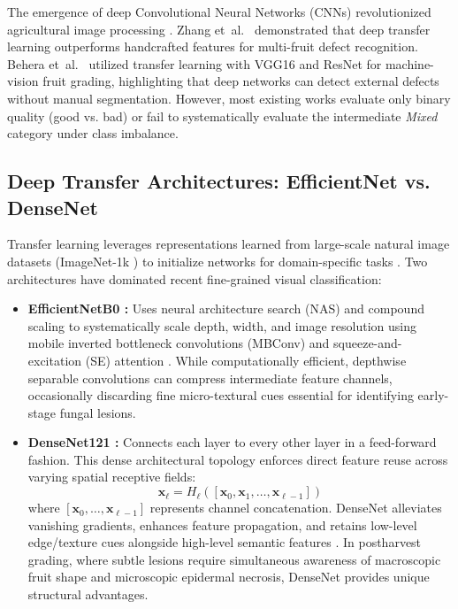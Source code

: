 \documentclass[conference]{IEEEtran}
\begin{document}
The emergence of deep Convolutional Neural Networks (CNNs) revolutionized agricultural image processing \cite{kamilaris2018deep, saleem2019plant}. Zhang et~al.~\cite{zhang2018fruit} demonstrated that deep transfer learning outperforms handcrafted features for multi-fruit defect recognition. Behera et~al.~\cite{behera2020fruit} utilized transfer learning with VGG16 and ResNet for machine-vision fruit grading, highlighting that deep networks can detect external defects without manual segmentation. However, most existing works evaluate only binary quality (good vs. bad) or fail to systematically evaluate the intermediate \textit{Mixed} category under class imbalance.

\subsection{Deep Transfer Architectures: EfficientNet vs. DenseNet}
Transfer learning leverages representations learned from large-scale natural image datasets (ImageNet-1k \cite{russakovsky2015imagenet}) to initialize networks for domain-specific tasks \cite{yosinski2014transferable}. Two architectures have dominated recent fine-grained visual classification:
\begin{itemize}
    \item \textbf{EfficientNetB0 \cite{tan2019efficientnet}:} Uses neural architecture search (NAS) and compound scaling to systematically scale depth, width, and image resolution using mobile inverted bottleneck convolutions (MBConv) and squeeze-and-excitation (SE) attention \cite{hu2018squeeze}. While computationally efficient, depthwise separable convolutions can compress intermediate feature channels, occasionally discarding fine micro-textural cues essential for identifying early-stage fungal lesions.
    \item \textbf{DenseNet121 \cite{huang2017densely}:} Connects each layer to every other layer in a feed-forward fashion. This dense architectural topology enforces direct feature reuse across varying spatial receptive fields:
    \begin{equation}
        \mathbf{x}_\ell = H_\ell([\mathbf{x}_0, \mathbf{x}_1, \dots, \mathbf{x}_{\ell-1}])
    \end{equation}
    where $[\mathbf{x}_0, \dots, \mathbf{x}_{\ell-1}]$ represents channel concatenation. DenseNet alleviates vanishing gradients, enhances feature propagation, and retains low-level edge/texture cues alongside high-level semantic features \cite{huang2017densely}. In postharvest grading, where subtle lesions require simultaneous awareness of macroscopic fruit shape and microscopic epidermal necrosis, DenseNet provides unique structural advantages.
\end{itemize}
\end{document}
